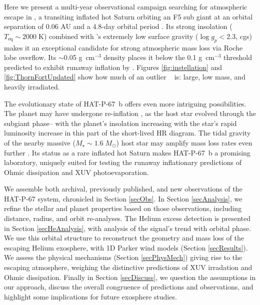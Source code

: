 \documentclass[twocolumn]{aastex631}
\newcommand{\hatpb}{\object{HAT-P-67 b}}
\begin{document}
Here we present a multi-year observational campaign searching for atmospheric escape in , a transiting inflated hot Saturn orbiting an F5 sub giant at an orbital separation of 0.06 AU and a 4.8-day orbital period \citep{2017AJ....153..211Z}.  Its strong insolation ($T_\mathrm{eq}\sim2000\;$K) combined with 's extremely low surface gravity ($\log{g_p}<2.3$, cgs) makes it an exceptional candidate for strong atmospheric mass loss via Roche lobe overflow.  Its $\sim$0.05 g~cm$^{-3}$ density places it below the 0.1 g~cm$^{-3}$ threshold predicted to exhibit runaway inflation by \citet{2023ApJ...945L..36T}.  Figures \ref{fig:instellation} and \ref{fig:ThornFortUpdated} show how much of an outlier \hatpb~ is: large, low mass, and heavily irradiated.    

The evolutionary state of HAT-P-67~b offers even more intriguing possibilities.  The planet may have undergone re-inflation \citep{2022AJ....163...53S, 2022AJ....163..120G, 2023arXiv230306728G}, as the host star evolved through the subgiant phase-- with the planet's insolation increasing with the star's rapid luminosity increase in this part of the short-lived HR diagram.  The tidal gravity of the nearby massive ($M_\star \sim1.6\;M_\odot$) host star may amplify mass loss rates even further \citep{2007A&A...472..329E, 2023ApJ...945L..36T}. Its status as a rare inflated hot Saturn makes HAT-P-67~b a promising laboratory, uniquely suited for testing the runaway inflationary predictions of Ohmic dissipation and XUV photoevaporation.

We assemble both archival, previously published, and new observations of the HAT-P-67 system, chronicled in Section \ref{secObs}.  In Section \ref{secAnalysis}, we refine the stellar and planet properties based on those observations, including distance, radius, and orbit re-analyses.  The Helium excess detection is presented in Section \ref{secHeAnalysis}, with analysis of the signal's trend with orbital phase.  We use this orbital structure to reconstruct the geometry and mass loss of the escaping Helium exosphere, with 1D Parker wind models (Section \ref{secResults}).  We assess the physical mechanisms (Section \ref{secPhysMech}) giving rise to the escaping atmosphere, weighing the distinctive predictions of XUV irradation and Ohmic dissipation.  Finally in Section \ref{secDiscuss}, we question the assumptions in our approach, discuss the overall congruence of predictions and observations, and highlight some implications for future exosphere studies.
\end{document}
